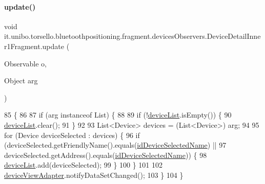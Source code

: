 \paragraph{\texorpdfstring{update()}{update()}}
{\footnotesize\ttfamily void it.\+unibo.\+torsello.\+bluetoothpositioning.\+fragment.\+devices\+Observers.\+Device\+Detail\+Inner1\+Fragment.\+update (\begin{DoxyParamCaption}\item[{Observable}]{o,  }\item[{Object}]{arg }\end{DoxyParamCaption})}


\begin{DoxyCode}
85                                                  \{
86 
87         \textcolor{keywordflow}{if} (arg instanceof List) \{
88 
89             \textcolor{keywordflow}{if} (!\hyperlink{classit_1_1unibo_1_1torsello_1_1bluetoothpositioning_1_1fragment_1_1devicesObservers_1_1DeviceDetailInner1Fragment_ab9fa77b8ee7b5d5fef44743f6f5c8458_ab9fa77b8ee7b5d5fef44743f6f5c8458}{deviceList}.isEmpty()) \{
90                 \hyperlink{classit_1_1unibo_1_1torsello_1_1bluetoothpositioning_1_1fragment_1_1devicesObservers_1_1DeviceDetailInner1Fragment_ab9fa77b8ee7b5d5fef44743f6f5c8458_ab9fa77b8ee7b5d5fef44743f6f5c8458}{deviceList}.clear();
91             \}
92 
93             List<Device> devices = (List<Device>) arg;
94 
95             \textcolor{keywordflow}{for} (Device deviceSelected : devices) \{
96                 \textcolor{keywordflow}{if} (deviceSelected.getFriendlyName().equals(\hyperlink{classit_1_1unibo_1_1torsello_1_1bluetoothpositioning_1_1fragment_1_1devicesObservers_1_1DeviceDetailInner1Fragment_a32265c6cbb2a0695e9c401d3f2acb9d3_a32265c6cbb2a0695e9c401d3f2acb9d3}{idDeviceSelectedName}) ||
97                         deviceSelected.getAddress().equals(\hyperlink{classit_1_1unibo_1_1torsello_1_1bluetoothpositioning_1_1fragment_1_1devicesObservers_1_1DeviceDetailInner1Fragment_a32265c6cbb2a0695e9c401d3f2acb9d3_a32265c6cbb2a0695e9c401d3f2acb9d3}{idDeviceSelectedName})) \{
98                     \hyperlink{classit_1_1unibo_1_1torsello_1_1bluetoothpositioning_1_1fragment_1_1devicesObservers_1_1DeviceDetailInner1Fragment_ab9fa77b8ee7b5d5fef44743f6f5c8458_ab9fa77b8ee7b5d5fef44743f6f5c8458}{deviceList}.add(deviceSelected);
99                 \}
100             \}
101 
102             \hyperlink{classit_1_1unibo_1_1torsello_1_1bluetoothpositioning_1_1fragment_1_1devicesObservers_1_1DeviceDetailInner1Fragment_a981ec49aae98052b414864feb742cbc5_a981ec49aae98052b414864feb742cbc5}{deviceViewAdapter}.notifyDataSetChanged();
103         \}
104     \}
\end{DoxyCode}


